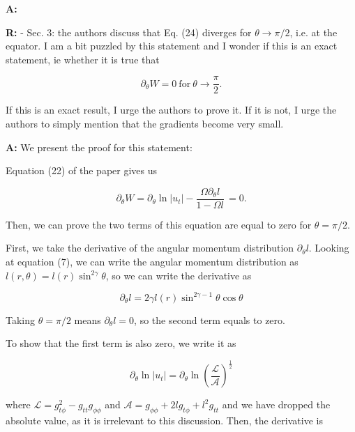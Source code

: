 \documentclass{article}
\begin{document}
{\bigskip

{\bf A:} 

\bigskip

{\bf R:} - Sec. 3: the authors discuss that Eq. (24) diverges for $\theta \rightarrow \pi/2$,
i.e. at the equator. I am a bit puzzled by this statement and I wonder if
this is an exact statement, ie whether it is true that

\begin{equation}
\partial_{\theta} W = 0 \ \mathrm{for} \ \theta \rightarrow \frac{\pi}{2}.
\end{equation}

If this is an exact result, I urge the authors to prove it. If it is
not, I urge the authors to simply mention that the gradients become
very small.

\bigskip

{\bf A:} We present the proof for this statement:

Equation (22) of the paper gives us

\begin{equation}
\partial_{\theta} W = \partial_{\theta} \ln|u_t| - \frac{\Omega \partial_{\theta}l}{1 - \Omega l}\, = 0.
\end{equation}

Then, we can prove the two terms of this equation are equal to zero for $\theta = \pi/2$.

First, we take the derivative of the angular momentum distribution $\partial_{\theta} l$. Looking at equation (7), we can write the angular momentum distribution as $l(r, \theta) = l(r) \sin^{2\gamma} \theta$, so we can write the derivative as

\begin{equation}
\partial_{\theta} l = 2\gamma l(r) \sin^{2\gamma - 1} \theta \cos \theta
\end{equation}

Taking $\theta = \pi/2$ means $\partial_{\theta} l = 0$, so the second term equals to zero.

To show that the first term is also zero, we write it as

\begin{equation}
\partial_{\theta} \ln|u_t| = \partial_{\theta} \ln \left(\frac{\mathcal{L}}{\mathcal{A}}\right)^{\frac{1}{2}}
\end{equation}

where $\mathcal{L} = g_{t \phi}^2 - g_{tt} g_{\phi\phi}$ and $\mathcal{A} = g_{\phi\phi} + 2 l g_{t\phi} + l^2g_{tt}$ and we have dropped the absolute value, as it is irrelevant to this discussion. Then, the derivative is

}
\end{document}
